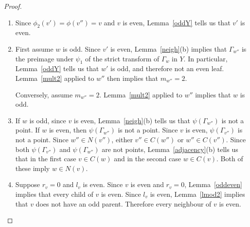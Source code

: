 \begin{proof} \hfill
\begin{enumerate}[\upshape (a)] 
  \item Since $\phi_2(v') = \phi(v'') = v$ and $v$ is even, Lemma~\ref{oddY} tells us that $v'$ is even. 
 
  \item First assume $w$ is odd. Since $v'$ is even, Lemma~\ref{neigh}(b) implies that $\Gamma_{w''}$ is the preimage under $\psi_1$ of the strict transform of $\Gamma_w$ in $Y$. In particular, Lemma~\ref{oddY} tells us that $w'$ is odd, and therefore not an even leaf. Lemma~\ref{mult2} applied to $w''$ then implies that $m_{w''} = 2$. 
  
  Conversely, assume $m_{w''} = 2$.  Lemma~\ref{mult2} applied to $w''$ implies that $w$ is odd. 
  
  \item If $w$ is odd, since $v$ is even, Lemma~\ref{neigh}(b) tells us that $\psi(\Gamma_{w''})$ is not a point. If $w$ is even, then $\psi(\Gamma_{w''})$ is not a point. Since $v$ is even,  $\psi(\Gamma_{v''})$ is not a point. Since $w'' \in N(v'')$, either $v'' \in C(w'')$ or $w'' \in C(v'')$. Since both $\psi(\Gamma_{v''})$ and $\psi(\Gamma_{w''})$ are not points, Lemma~\ref{adjacency}(b) tells us that in the first case $v \in C(w)$ and in the second case $w \in C(v)$. Both of these imply $w \in N(v)$. 
  
  \item Suppose $r_v = 0$ and $l_v$ is even. Since $v$ is even and $r_v = 0$, Lemma~\ref{oddeven} implies that every child of $v$ is even. Since $l_v$ is even, Lemma~\ref{lmod2} implies that $v$ does not have an odd parent. Therefore every neighbour of $v$ is even.
  

\end{enumerate}
\end{proof}
